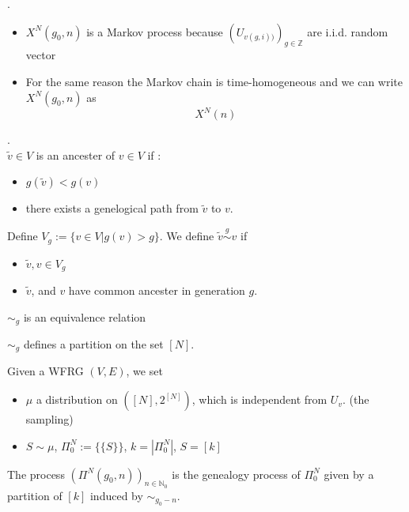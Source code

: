 \begin{remark}.
\begin{itemize}
	\item $X^N(g_0, n)$ is a Markov process because $(U_{v(g, i))})_{g \in \mathbb{Z}}$ are i.i.d. random vector
	\item For the same reason the Markov chain is time-homogeneous and we can write $X^N(g_0, n)$ as
	\begin{equation*}
		X^N(n)
	\end{equation*}
\end{itemize}
\end{remark}

\begin{definition}.\\
	$\tilde{v} \in V$ is an ancester of $v \in V$ if : 
	\begin{itemize}
		\item $g(\tilde{v}) < g(v)$
		\item there exists a genelogical path from $\tilde{v}$ to $v$.
	\end{itemize}
	Define $V_g:= \{v \in V| g(v) > g\}$. We define $\tilde{v} \overset{g}{\sim} v $ if 
	\begin{itemize}
		\item $\tilde{v}, v \in V_g$
		\item $\tilde{v}$, and $v$ have common ancester in generation $g$.
	\end{itemize}
\end{definition}

\begin{theorem}
	$\sim_g$ is an equivalence relation
\end{theorem}
\begin{remark}
$\sim_g$ defines a partition on the set $[N]$.	
\end{remark}

\begin{definition}
	Given a WFRG $(V, E)$, we set
	\begin{itemize}
		\item $\mu$ a distribution on $([N], 2^{[N]})$, which is independent from $U_v$. (the sampling)
		\item $S \sim \mu$, $\Pi_0^N := \{\{S\}\}$, $k = | \Pi_0^N|$, $S = [k]$
	\end{itemize}
	The process $(\Pi^N(g_0, n))_{n \in \mathbb{N}_0}$ is the genealogy process of $\Pi^N_0$ given by a partition of $[k]$ induced by $\sim_{g_0 -n}$.
\end{definition}
\begin{remark}
\end{remark}

